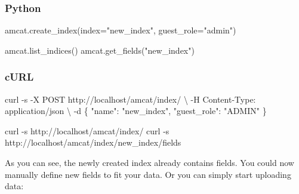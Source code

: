 \documentclass[
  letterpaper,
  DIV=11,
  numbers=noendperiod]{scrreprt}
\newenvironment{Shaded}{\begin{snugshade}}{\end{snugshade}}
\newcommand{\AttributeTok}[1]{\textcolor[rgb]{0.40,0.45,0.13}{#1}}
\newcommand{\DataTypeTok}[1]{\textcolor[rgb]{0.68,0.00,0.00}{#1}}
\newcommand{\ExtensionTok}[1]{\textcolor[rgb]{0.00,0.23,0.31}{#1}}
\newcommand{\NormalTok}[1]{\textcolor[rgb]{0.00,0.23,0.31}{#1}}
\newcommand{\OperatorTok}[1]{\textcolor[rgb]{0.37,0.37,0.37}{#1}}
\newcommand{\StringTok}[1]{\textcolor[rgb]{0.13,0.47,0.30}{#1}}
\begin{document}
\subsubsection{Python}

\begin{Shaded}
\begin{Highlighting}[]
\NormalTok{amcat.create\_index(index}\OperatorTok{=}\StringTok{"new\_index"}\NormalTok{, guest\_role}\OperatorTok{=}\StringTok{"admin"}\NormalTok{)}
\end{Highlighting}
\end{Shaded}

\begin{Shaded}
\begin{Highlighting}[]
\NormalTok{amcat.list\_indices()}
\NormalTok{amcat.get\_fields(}\StringTok{"new\_index"}\NormalTok{)}
\end{Highlighting}
\end{Shaded}

\subsubsection{cURL}

\begin{Shaded}
\begin{Highlighting}[]
\ExtensionTok{curl} \AttributeTok{{-}s} \AttributeTok{{-}X}\NormalTok{ POST http://localhost/amcat/index/ }\DataTypeTok{\textbackslash{}}
  \AttributeTok{{-}H} \StringTok{\textquotesingle{}Content{-}Type: application/json\textquotesingle{}} \DataTypeTok{\textbackslash{}}
  \AttributeTok{{-}d} \StringTok{\textquotesingle{}\{}
\StringTok{        "name": "new\_index",}
\StringTok{        "guest\_role": "ADMIN"}
\StringTok{      \}\textquotesingle{}}
\end{Highlighting}
\end{Shaded}

\begin{Shaded}
\begin{Highlighting}[]
\ExtensionTok{curl} \AttributeTok{{-}s}\NormalTok{ http://localhost/amcat/index/}
\ExtensionTok{curl} \AttributeTok{{-}s}\NormalTok{ http://localhost/amcat/index/new\_index/fields}
\end{Highlighting}
\end{Shaded}

As you can see, the newly created index already contains fields. You
could now manually define new fields to fit your data. Or you can simply
start uploading data:
\end{document}
